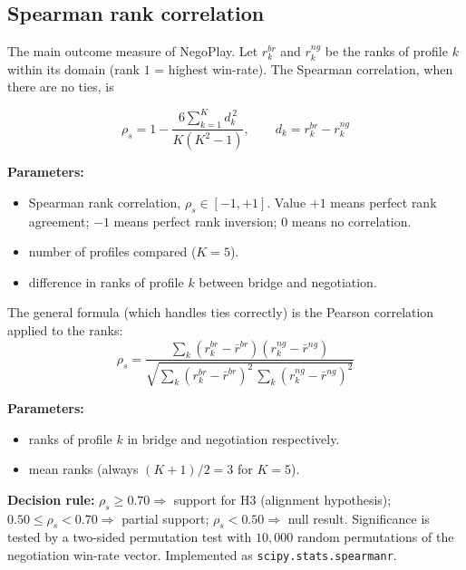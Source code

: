 \documentclass[11pt, a4paper, oneside, openany]{report}
\begin{document}
\subsection{Spearman rank correlation}

The main outcome measure of NegoPlay. Let $r_k^{br}$ and $r_k^{ng}$ be the ranks of profile $k$ within its domain (rank $1$ = highest win-rate). The Spearman correlation, when there are no ties, is

\begin{equation}
\label{eq:spearman}
\rho_s = 1 - \frac{6 \sum_{k=1}^{K} d_k^{\,2}}{K(K^2 - 1)}, \qquad d_k = r_k^{br} - r_k^{ng}
\end{equation}

\noindent\textbf{Parameters:}
\begin{itemize}[leftmargin=2.2cm, itemsep=0pt, topsep=2pt]
    \item[$\rho_s$] Spearman rank correlation, $\rho_s \in [-1, +1]$. Value $+1$ means perfect rank agreement; $-1$ means perfect rank inversion; $0$ means no correlation.
    \item[$K$] number of profiles compared ($K = 5$).
    \item[$d_k$] difference in ranks of profile $k$ between bridge and negotiation.
\end{itemize}

The general formula (which handles ties correctly) is the Pearson correlation applied to the ranks:
\begin{equation}
\label{eq:spearman_general}
\rho_s = \frac{\sum_k (r_k^{br} - \bar{r}^{br})(r_k^{ng} - \bar{r}^{ng})}{\sqrt{\sum_k (r_k^{br} - \bar{r}^{br})^2\, \sum_k (r_k^{ng} - \bar{r}^{ng})^2}}
\end{equation}

\noindent\textbf{Parameters:}
\begin{itemize}[leftmargin=2.2cm, itemsep=0pt, topsep=2pt]
    \item[$r_k^{br}, r_k^{ng}$] ranks of profile $k$ in bridge and negotiation respectively.
    \item[$\bar{r}^{br}, \bar{r}^{ng}$] mean ranks (always $(K+1)/2 = 3$ for $K=5$).
\end{itemize}

\noindent\textbf{Decision rule:} $\rho_s \geq 0.70 \Rightarrow$ support for H3 (alignment hypothesis); $0.50 \leq \rho_s < 0.70 \Rightarrow$ partial support; $\rho_s < 0.50 \Rightarrow$ null result. Significance is tested by a two-sided permutation test with $10{,}000$ random permutations of the negotiation win-rate vector. Implemented as \texttt{scipy.stats.spearmanr}.
\end{document}
